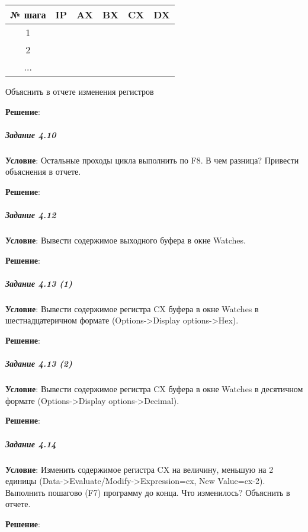 \begin{table}[!ht]
   \centering

   \begin{tabular}{|c|c|c|c|c|c|} 
      \hline
      № шага  & IP  & AX  & BX  & CX  & DX  \\ \hline
      \hline
      1       &     &     &     &     &     \\ \hline
      2       &     &     &     &     &     \\ \hline
      ...     &     &     &     &     &     \\ \hline
   \end{tabular}
\end{table}

Объяснить в отчете изменения регистров

\textbf{Решение}:



\subparagraph{Задание 4.10}

\textbf{Условие}:
Остальные проходы цикла выполнить по F8. В чем разница? Привести объяснения в отчете.

\textbf{Решение}:



\subparagraph{Задание 4.12}

\textbf{Условие}: Вывести содержимое выходного буфера в окне Watches. 

\textbf{Решение}:



\subparagraph{Задание 4.13 (1)}

\textbf{Условие}: Вывести содержимое регистра CX буфера в окне Watches в шестнадцатеричном формате (Options->Display options->Hex).

\textbf{Решение}:



\subparagraph{Задание 4.13 (2)}

\textbf{Условие}:
Вывести содержимое регистра CX буфера в окне Watches в десятичном формате (Options->Display options->Decimal).

\textbf{Решение}:



\subparagraph{Задание 4.14}

\textbf{Условие}:
Изменить содержимое регистра CX на величину, меньшую на 2 единицы (Data->Evaluate/Modify->Expression=cx, New Value=cx-2). Выполнить пошагово (F7) программу до конца. Что изменилось? Объяснить в отчете.

\textbf{Решение}:



